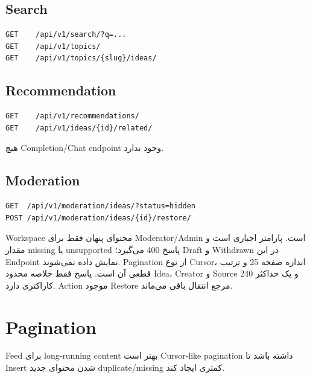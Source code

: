 \subsection{Search}

\begin{latin}
\begin{lstlisting}
GET    /api/v1/search/?q=...
GET    /api/v1/topics/
GET    /api/v1/topics/{slug}/ideas/
\end{lstlisting}
\end{latin}

\subsection{Recommendation}

\begin{latin}
\begin{lstlisting}
GET    /api/v1/recommendations/
GET    /api/v1/ideas/{id}/related/
\end{lstlisting}
\end{latin}

هیچ Completion/Chat endpoint وجود ندارد.

\subsection{Moderation}

\begin{latin}
\begin{lstlisting}
GET  /api/v1/moderation/ideas/?status=hidden
POST /api/v1/moderation/ideas/{id}/restore/
\end{lstlisting}
\end{latin}

Workspace محتوای پنهان فقط برای Moderator/Admin است. پارامتر
 اجباری است و مقدار missing یا unsupported پاسخ 400 می‌گیرد؛
Draft و Withdrawn در این Endpoint نمایش داده نمی‌شوند. Pagination از نوع Cursor،
اندازه صفحه 25 و ترتیب قطعی آن  است. پاسخ فقط خلاصه محدود
Idea، Creator و Source و یک  حداکثر 240 کاراکتری دارد.
Action موجود Restore مرجع انتقال  باقی می‌ماند.

\section{Pagination}

Feed برای long-running content بهتر است Cursor-like pagination داشته باشد تا Insert شدن محتوای جدید duplicate/missing کمتری ایجاد کند.

